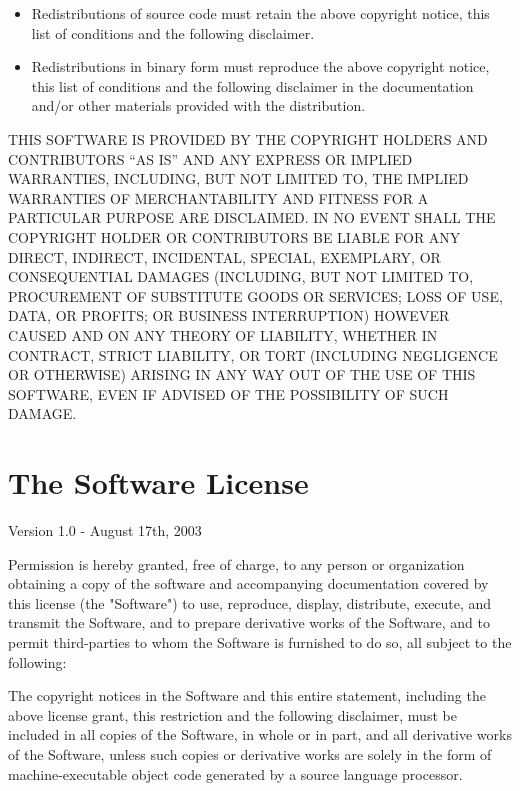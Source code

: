 \begin{itemize}
\itemsep1pt\parskip0pt
\item
  Redistributions of source code must retain the above copyright notice,
  this list of conditions and the following disclaimer.
\item
  Redistributions in binary form must reproduce the above copyright
  notice, this list of conditions and the following disclaimer in the
  documentation and/or other materials provided with the distribution.
\end{itemize}

THIS SOFTWARE IS PROVIDED BY THE COPYRIGHT HOLDERS AND CONTRIBUTORS ``AS
IS'' AND ANY EXPRESS OR IMPLIED WARRANTIES, INCLUDING, BUT NOT LIMITED
TO, THE IMPLIED WARRANTIES OF MERCHANTABILITY AND FITNESS FOR A
PARTICULAR PURPOSE ARE DISCLAIMED. IN NO EVENT SHALL THE COPYRIGHT
HOLDER OR CONTRIBUTORS BE LIABLE FOR ANY DIRECT, INDIRECT, INCIDENTAL,
SPECIAL, EXEMPLARY, OR CONSEQUENTIAL DAMAGES (INCLUDING, BUT NOT LIMITED
TO, PROCUREMENT OF SUBSTITUTE GOODS OR SERVICES; LOSS OF USE, DATA, OR
PROFITS; OR BUSINESS INTERRUPTION) HOWEVER CAUSED AND ON ANY THEORY OF
LIABILITY, WHETHER IN CONTRACT, STRICT LIABILITY, OR TORT (INCLUDING
NEGLIGENCE OR OTHERWISE) ARISING IN ANY WAY OUT OF THE USE OF THIS
SOFTWARE, EVEN IF ADVISED OF THE POSSIBILITY OF SUCH DAMAGE.

\section{The \boost Software License}
\label{boost_license}

Version 1.0 - August 17th, 2003

Permission is hereby granted, free of charge, to any person or organization
obtaining a copy of the software and accompanying documentation covered by
this license (the "Software") to use, reproduce, display, distribute,
execute, and transmit the Software, and to prepare derivative works of the
Software, and to permit third-parties to whom the Software is furnished to
do so, all subject to the following:

The copyright notices in the Software and this entire statement, including
the above license grant, this restriction and the following disclaimer,
must be included in all copies of the Software, in whole or in part, and
all derivative works of the Software, unless such copies or derivative
works are solely in the form of machine-executable object code generated by
a source language processor.

